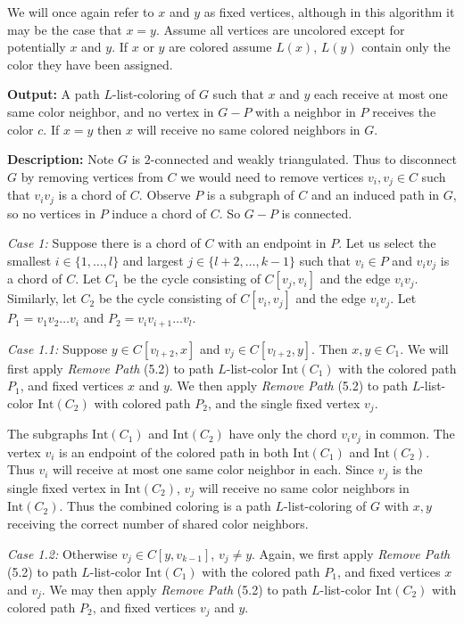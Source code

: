 \documentclass[letterpaper, 12pt]{article}
\theoremstyle{definition}
\theoremstyle{definition}
\theoremstyle{thm}
\theoremstyle{definition}
\begin{document}
We will once again refer to $x$ and $y$ as fixed vertices, although in this
algorithm it may be the case that $x=y$. Assume all
vertices are uncolored except for potentially $x$ and $y$. If $x$ or $y$ are
colored assume $L(x)$, $L(y)$ contain only the color they have been assigned.

\noindent\textbf{Output:} A path $L$-list-coloring of $G$ such that $x$ and
$y$ each receive at most one same color neighbor, and no vertex in
$G-P$ with a neighbor in $P$ receives the color $c$. If $x=y$ then $x$ will
receive no same colored neighbors in $G$.

\noindent\textbf{Description:}
Note $G$ is $2$-connected and weakly triangulated. Thus to disconnect $G$ by
removing vertices from $C$ we would need to remove vertices
$v_i,v_j\in C$ such that $v_iv_j$ is a chord of $C$.
Observe $P$ is a subgraph of $C$ and an induced path in $G$, so no vertices in
$P$ induce a chord of $C$. So $G-P$ is connected.

\textit{Case 1:} Suppose there is a chord of $C$ with an endpoint in $P$. Let us
select the smallest $i\in\{1,\ldots,l\}$ and largest $j\in\{l+2,\ldots,k-1\}$
such that $v_i\in P$ and $v_iv_j$ is a chord of $C$. Let $C_1$ be the cycle
consisting of $C[v_j,v_i]$ and the edge $v_iv_j$. Similarly, let $C_2$ be the
cycle consisting of $C[v_i,v_j]$ and the edge $v_iv_j$. Let
$P_1=v_1v_2\ldots v_i$ and $P_2=v_iv_{i+1}\ldots v_l$.

\textit{Case 1.1:} Suppose $y\in C[v_{l+2},x]$ and $v_j\in C[v_{l+2},y]$.
Then $x,y\in C_1$. We will first apply \textit{Remove Path} (5.2) to path
$L$-list-color $\text{Int}(C_1)$ with the colored path $P_1$, and fixed vertices
$x$ and $y$. We then apply \textit{Remove Path} (5.2)
to path $L$-list-color $\text{Int}(C_2)$ with colored path $P_2$, and the single
fixed vertex $v_j$.

The subgraphs $\text{Int}(C_1)$ and $\text{Int}(C_2)$ have only the chord
$v_iv_j$ in common. The vertex $v_i$ is an endpoint of the colored path in both
$\text{Int}(C_1)$ and $\text{Int}(C_2)$. Thus $v_i$ will receive at most one
same color neighbor in each. Since $v_j$ is the single fixed vertex in
$\text{Int}(C_2)$, $v_j$ will receive no same color neighbors in
$\text{Int}(C_2)$. Thus the combined coloring is a path $L$-list-coloring of
$G$ with $x,y$ receiving the correct number of shared color neighbors.

\textit{Case 1.2:} Otherwise $v_j\in C[y,v_{k-1}]$, $v_j\ne y$. Again, we first
apply \textit{Remove Path} (5.2) to path $L$-list-color $\text{Int}(C_1)$ with
the colored path $P_1$, and fixed vertices $x$ and $v_j$.
We may then apply \textit{Remove Path} (5.2) to path $L$-list-color
$\text{Int}(C_2)$ with colored path $P_2$, and fixed vertices $v_j$ and $y$.
\end{document}
